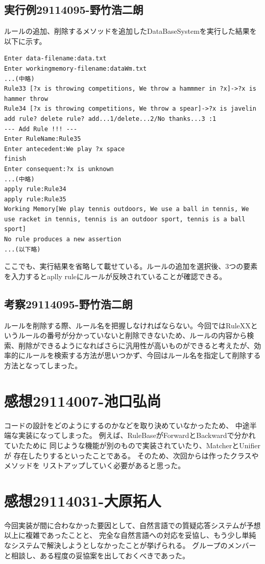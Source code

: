 \documentclass{jarticle}
\begin{document}
\subsection{実行例29114095-野竹浩二朗}
ルールの追加、削除するメソッドを追加したDataBaseSystemを実行した結果を以下に示す。
\begin{lstlisting}
Enter data-filename:data.txt
Enter workingmemory-filename:dataWm.txt
...(中略)
Rule33 [?x is throwing competitions, We throw a hammmer in ?x]->?x is hammer throw
Rule34 [?x is throwing competitions, We throw a spear]->?x is javelin
add rule? delete rule? add...1/delete...2/No thanks...3 :1
--- Add Rule !!! ---
Enter RuleName:Rule35
Enter antecedent:We play ?x space
finish
Enter consequent:?x is unknown
...(中略)
apply rule:Rule34
apply rule:Rule35
Working Memory[We play tennis outdoors, We use a ball in tennis, We use racket in tennis, tennis is an outdoor sport, tennis is a ball sport]
No rule produces a new assertion
...(以下略)
\end{lstlisting}
ここでも、実行結果を省略して載せている。ルールの追加を選択後、3つの要素を入力するとaplly ruleにルールが反映されていることが確認できる。
\subsection{考察29114095-野竹浩二朗}
ルールを削除する際、ルール名を把握しなければならない。今回ではRuleXXというルールの番号が分かっていないと削除できないため、ルールの内容から検索、削除ができるようになればさらに汎用性が高いものができると考えたが、効率的にルールを検索する方法が思いつかず、今回はルール名を指定して削除する方法となってしまった。

\section{感想29114007-池口弘尚}
コードの設計をどのようにするのかなどを取り決めていなかったため、
中途半端な実装になってしまった。
例えば、RuleBaseがForwardとBackwardで分かれていたために
同じような機能が別のもので実装されていたり、MatcherとUnifierが
存在したりするといったことである。
そのため、次回からは作ったクラスやメソッドを
リストアップしていく必要があると思った。
\section{感想29114031-大原拓人}
今回実装が間に合わなかった要因として、自然言語での質疑応答システムが予想以上に複雑であったことと、
完全な自然言語への対応を妥協し、もう少し単純なシステムで解決しようとしなかったことが挙げられる。
グループのメンバーと相談し、ある程度の妥協案を出しておくべきであった。
\end{document}
